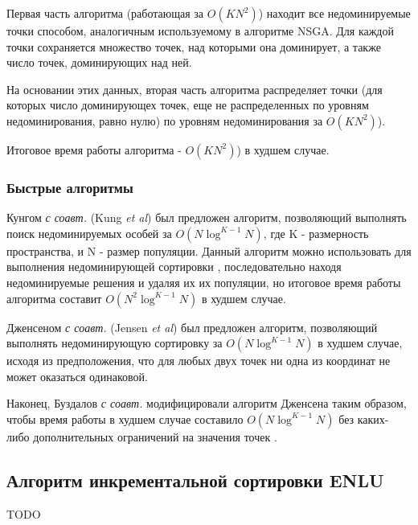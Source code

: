 Первая часть алгоритма (работающая за $O(KN^2)$) находит все недоминируемые точки способом,
аналогичным используемому в алгоритме NSGA. Для каждой точки сохраняется множество точек,
над которыми она доминирует, а также число точек, доминирующих над ней.

На основании этих данных, вторая часть алгоритма распределяет точки (для которых число
доминирующех точек, еще не распределенных по уровням недоминирования, равно нулю) по уровням
недоминирования за $O(KN^2)$).

Итоговое время работы алгоритма - $O(KN^2)$) в худшем случае.

\subsubsection{Быстрые алгоритмы}
Кунгом \textit{с соавт.} (Kung \textit{et al}) \cite{kung} был предложен алгоритм, позволяющий 
выполнять поиск недоминируемых особей за $O(N \log^{K - 1} N)$, где K - размерность пространства, 
и N - размер популяции. Данный алгоритм можно использовать для выполнения недоминирующей сортировки \cite{max_me_ss_nsga2}, 
последовательно находя недоминируемые решения и удаляя их их популяции, но итоговое время работы
алгоритма составит $O(N^2 \log^{K - 1} N)$ в худшем случае.

Дженсеном \textit{с соавт.} (Jensen \textit{et al}) \cite{jensen} был предложен алгоритм, позволяющий 
выполнять недоминирующую сортировку за $O(N \log^{K - 1} N)$ в худшем случае, исходя из предположения,
что для любых двух точек ни одна из координат не может оказаться одинаковой.

Наконец, Буздалов \textit{с соавт.} модифицировали алгоритм Дженсена таким образом, чтобы
время работы в худшем случае составило $O(N \log^{K - 1} N)$ без каких-либо дополнительных ограничений
на значения точек \cite{max_sort}.

\subsection{Алгоритм инкрементальной сортировки ENLU}
TODO